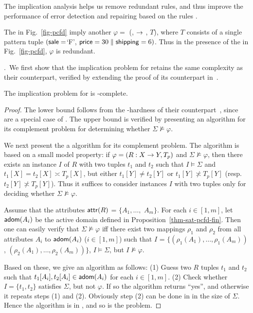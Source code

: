The implication analysis helps us
remove redundant rules, and thus improve the
performance of error detection and repairing based on
the rules \cite{CFDs,tcs-CINDs}.

\begin{example}
\label{exa-implication} The \pCFDs in Fig.~\ref{fig-pcfd} imply
another \pCFD $\varphi =$ (,  $\rightarrow$
, $T$), where $T$ consists of a single pattern tuple
$(\protect\mathsf{sale} = $`F', $\protect\mathsf{price} = 30 \parallel \protect\mathsf{shipping} = 6)$. Thus
in the presence of the \pCFDs in Fig.~\ref{fig-pcfd}, $\varphi$ is
redundant. 
\end{example}
\vspace{-1ex}

.~We first show that
the implication problem for \pCFDs retains
the same complexity as their \CFDs counterpart, verified by
extending the proof of its counterpart in~\cite{CFDs}.

\begin{prop}
\label{thm-imp-pcfd-fin} The implication problem for \pCFDs is
\coNP-complete.
\end{prop}



\begin{proof}
The lower bound follows from the
\coNP-hardness of their \CFDs counterpart~\cite{CFDs}, since \CFDs
are a special case of \pCFDs. The \coNP upper bound is verified
by presenting an \NP algorithm for its complement problem for determining whether $\Sigma\not\models\varphi$.



We next present the a \NP algorithm
for its complement problem. The algorithm is based on a small model
property: if $\varphi = (R: X \rightarrow Y, T_p)$ and $\Sigma
\not\models\varphi$, then there exists an instance $I$ of $R$ with
two tuples $t_1$ and $t_2$ such that $I\models\Sigma$ and $t_1[X] =
t_2[X] \asymp T_p[X]$, but either $t_1[Y]\ne t_2[Y]$ or
$t_1[Y]\not\asymp T_p[Y]$ (resp. $t_2[Y]\not\asymp T_p[Y]$). Thus it
suffices to consider instances $I$ with two tuples only for deciding
whether $\Sigma\not\models\varphi$.

Assume that the attributes $\protect\mathsf{attr}(R)$ = $\{A_1,\dots,$
$A_m\}$. For each $i\in [1, m]$, let ${\mathsf{adom}}(A_i)$ be the active domain defined in
Proposition~\ref{thm-sat-pcfd-fin}. Then one can easily verify that
$\Sigma\not\models\varphi$ iff there exist two mappings $\rho_1$ and
$\rho_2$ from all attributes $A_i$ to ${\mathsf{adom}}(A_i)$ ($i\in [1, m]$) such that $I$
= $\{(\rho_1(A_1), \ldots, \rho_1(A_m))$, $(\rho_2(A_1),
\ldots, \rho_2(A_m))\}$, $I \models\Sigma$, but 
$I\not\models\varphi$.

Based on these, we give an \NP algorithm as follows: (1) Guess two
$R$ tuples $t_1$ and $t_2$ such that $t_1[A_i],t_2[A_i]
\in{\ensuremath {\mathsf{adom}}}(A_i)$ for each $i \in [1, m]$. (2) Check whether $I =
\{t_1, t_2\}$ satisfies $\Sigma$, but not $\varphi$. If so the
algorithm returns ``yes'', and otherwise it repeats steps (1) and
(2). Obviously step (2) can be done in \PTIME in the size of $\Sigma$.
Hence the algorithm is in \NP, and so is the problem.
\end{proof}

